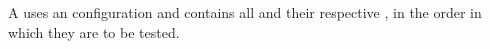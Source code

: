 
\item[\gdsuite]{
 A \gdsuite uses an \gdaut configuration and contains all \gdcases and their respective \gdsteps, in the order in which they are to be tested.
}
